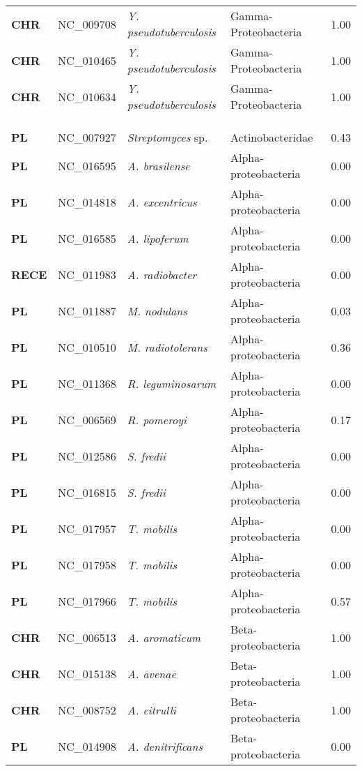 \begin{adjustwidth}{-3cm}{2cm}
{\begin{supertabular}{>{\bfseries}l|p{0.1\textwidth}p{0.14\textwidth}l|l}
CHR & NC\_009708 & \textit{Y. pseudotuberculosis} & Gamma-Proteobacteria & 1.00\\
CHR & NC\_010465 & \textit{Y. pseudotuberculosis} & Gamma-Proteobacteria & 1.00\\
CHR & NC\_010634 & \textit{Y. pseudotuberculosis} & Gamma-Proteobacteria & 1.00\\
\\
\\
\hline\\
PL & NC\_007927 & \textit{Streptomyces} sp. & Actinobacteridae & 0.43\\
PL & NC\_016595 & \textit{A. brasilense} & Alpha-proteobacteria & 0.00\\
PL & NC\_014818 & \textit{A. excentricus} & Alpha-proteobacteria & 0.00\\
PL & NC\_016585 & \textit{A. lipoferum} & Alpha-proteobacteria & 0.00\\
RECE & NC\_011983 & \textit{A. radiobacter} & Alpha-proteobacteria & 0.00\\
PL & NC\_011887 & \textit{M. nodulans} & Alpha-proteobacteria & 0.03\\
PL & NC\_010510 & \textit{M. radiotolerans} & Alpha-proteobacteria & 0.36\\
PL & NC\_011368 & \textit{R. leguminosarum} & Alpha-proteobacteria & 0.00\\
PL & NC\_006569 & \textit{R. pomeroyi} & Alpha-proteobacteria & 0.17\\
PL & NC\_012586 & \textit{S. fredii} & Alpha-proteobacteria & 0.00\\
PL & NC\_016815 & \textit{S. fredii} & Alpha-proteobacteria & 0.00\\
PL & NC\_017957 & \textit{T. mobilis} & Alpha-proteobacteria & 0.00\\
PL & NC\_017958 & \textit{T. mobilis} & Alpha-proteobacteria & 0.00\\
PL & NC\_017966 & \textit{T. mobilis} & Alpha-proteobacteria & 0.57\\
CHR & NC\_006513 & \textit{A. aromaticum} & Beta-proteobacteria & 1.00\\
CHR & NC\_015138 & \textit{A. avenae} & Beta-proteobacteria & 1.00\\
CHR & NC\_008752 & \textit{A. citrulli} & Beta-proteobacteria & 1.00\\
PL & NC\_014908 & \textit{A. denitrificans} & Beta-proteobacteria & 0.00\\

\end{supertabular}}
\end{adjustwidth}
